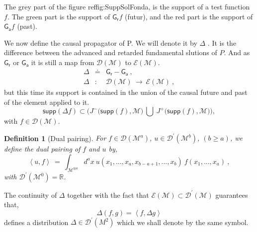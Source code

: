 \documentclass[10pt]{book}
\newcommand{\supp}{\mathsf{supp}}
\newcommand{\sm}[1]{\left\langle#1\right\rangle}
\newcommand{\Dcal}{\mathcal{D}}
\newcommand{\Ecal}{\mathcal{E}}
\newcommand{\Mcal}{\mathcal{M}}
\newcommand{\Rbb}{\mathbb{R}}
\newcommand{\Gsf}{\mathsf{G}}
\theoremstyle{break}
\newtheorem{definition}{Definition}
\begin{document}
%
The grey part of the figure ref{fig:SuppSolFonda}, is the support of a test function $f$. The green part is the support of $\Gsf_{\mathsf{r}} f$ (futur), and the red part is the support of $\Gsf_{\mathsf{a}} f$ (past). \par 
%
We now define the causal propagator  of P. We will denote it by $\Delta$ \index{$\Delta$}. It is the difference between the advanced and retarded fundamental slutions of $P$. And as $\Gsf_{\mathsf{r}}$ or $\Gsf_{\mathsf{a}}$ it is still a map from $\Dcal(\Mcal)$ to $\Ecal(\Mcal)$.
%
\begin{eqnarray}
\Delta &\doteq& \Gsf_{\mathsf{r}} - \Gsf_{\mathsf{a}} \ , \\
\Delta &:& \mathcal{D}(\Mcal) \ \to \ \mathcal{E}(\Mcal) \ ,
\end{eqnarray}
%
but this time its support is contained in the union of the causal future and past of the element applied to it.
%
\begin{equation}
\supp\left(\Delta f\right) \subset \bigg(J^{-}\big(\supp\left(f\right),\Mcal\big) \ \bigcup \ J^{+}\big(\supp\left(f\right),\Mcal\big)\bigg),
\end{equation}
%
with $f \in \mathcal{D}(\Mcal)$. 
%
\begin{definition}[Dual pairing]
For $f\in \mathcal{D}(\Mcal^a)$, $u\in \mathcal{D}^{\prime}(\Mcal^b)$, $(b\geq a)$, we define the dual pairing of $f$ and $u$ by,
%
\begin{equation}
\sm{u,f} \ = \ \int_{\Mcal^{\otimes a}} d^{a}x \ u(x_1,...,x_a,x_{b-a+1},...,x_b) \ f(x_1,...,x_a) \ , 
\end{equation}
%
with $\Dcal^{\prime}(\Mcal^0)=\Rbb$. 
\end{definition}

The continuity of $\Delta$ together with the fact that $\mathcal{E}(\Mcal) \subset \mathcal{D}^{\prime}(\Mcal)$ guarantees that,
%
\begin{equation}
\mathsf{\Delta}(f,g) = \sm{f,\Delta g}
\end{equation}
%
defines a distribution $\mathsf{\Delta} \in \mathcal{D}^{\prime}(M^2)$ which we shall denote by the same symbol.

\bigskip
\end{document}
